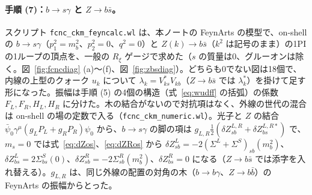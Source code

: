 \documentclass[a4paper,10pt]{ltjsarticle}
\begin{document}
\paragraph{手順 (7)：$b\to s\gamma$ と $Z\to b\bar s$。}スクリプト \texttt{fcnc\_ckm\_feyncalc.wl} は、本ノートの FeynArts の模型で、on-shell の $b\to s\gamma$（$p_1^2=m_b^2$、$p_2^2=0$、$q^2=0$）と $Z(k)\to b\bar s$（$k^2$ は記号のまま）の1PI の1ループの頂点を、一般の $R_\xi$ ゲージで求めた（$s$ の質量は0、グルーオンは除く。図~\ref{fig:fcncdiag} (a)〜(f)、図~\ref{fig:zbsdiag}）。どちらも0でない図は18個で、内線の上型のクォーク $u_k$ について $\lambda_k=V^*_{ks}V_{kb}$（$Z\to b\bar s$ では $\lambda_k^*$）を掛けて足す形になった。振幅は手順 (5) の4個の構造（式~\eqref{eq:wudff} の括弧）の係数 $F_L,F_R,H_L,H_R$ に分けた。木の結合がないので対抗項はなく、外線の世代の混合は on-shell の場の定数で入る（\texttt{fcnc\_ckm\_numeric.wl}）。光子と $Z$ の結合 $\bar\psi_0\gamma^\mu(g_LP_L+g_RP_R)\psi_0$ から、$b\to s\gamma$ の脚の項は $g_{L,R}\frac12(\delta Z^{L,R}_{sb}+\delta Z^{L,R*}_{bs})$ で、$m_s=0$ では式~\eqref{eq:dZos}、\eqref{eq:dZRos} から $\delta Z^L_{sb}=-2(\Sigma^L+\Sigma^S)_{sb}(m_b^2)$、$\delta Z^L_{bs}=2\Sigma^S_{bs}(0)$、$\delta Z^R_{sb}=-2\Sigma^R_{sb}(m_b^2)$、$\delta Z^R_{bs}=0$ になる（$Z\to b\bar s$ では添字を入れ替える）。$g_{L,R}$ は、同じ外線の配置の対角の木（$b\to b\gamma$、$Z\to b\bar b$）の FeynArts の振幅からとった。
\end{document}
